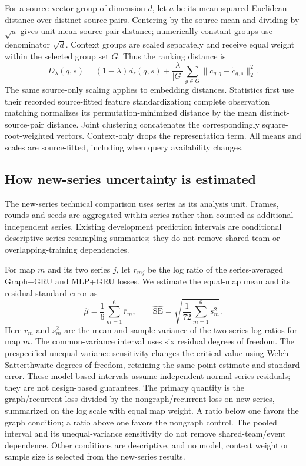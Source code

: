 For a source vector group of dimension $d$, let $a$ be its mean squared Euclidean distance over distinct source pairs. Centering by the source mean and dividing by $\sqrt{a}$ gives unit mean source-pair distance; numerically constant groups use denominator $\sqrt{d}$. Context groups are scaled separately and receive equal weight within the selected group set $G$. Thus the ranking distance is %
\begin{equation}
 D_\lambda(q,s)=(1-\lambda)d_z(q,s)
 +\frac{\lambda}{|G|}\sum_{g\in G}
 \|\widetilde{c}_{g,q}-\widetilde{c}_{g,s}\|_2^2.
\end{equation}
The same source-only scaling applies to embedding distances. Statistics first use their recorded source-fitted feature standardization; complete observation matching normalizes its permutation-minimized distance by the mean distinct-source-pair distance. Joint clustering concatenates the correspondingly square-root-weighted vectors. Context-only drops the representation term. All means and scales are source-fitted, including when query availability changes. %

\subsection{How new-series uncertainty is estimated}
The new-series technical comparison uses series as its analysis unit. Frames, rounds and seeds are aggregated within series rather than counted as additional independent series. Existing development prediction intervals are conditional descriptive series-resampling summaries; they do not remove shared-team or overlapping-training dependencies.

For map $m$ and its two series $j$, let $r_{mj}$ be the log ratio of the series-averaged Graph+GRU and MLP+GRU losses. We estimate the equal-map mean and its residual standard error as %
\begin{equation}
 \widehat{\mu}=\frac{1}{6}\sum_{m=1}^{6}\overline{r}_m,
 \qquad
 \widehat{\mathrm{SE}}=\sqrt{\frac{1}{72}\sum_{m=1}^{6}s_m^2}.
\end{equation}
Here $\overline{r}_m$ and $s_m^2$ are the mean and sample variance of the two series log ratios for map $m$. The common-variance interval uses six residual degrees of freedom. The prespecified unequal-variance sensitivity changes the critical value using Welch--Satterthwaite degrees of freedom, retaining the same point estimate and standard error. These model-based intervals assume independent normal series residuals; they are not design-based guarantees.
The primary quantity is the graph/recurrent loss divided by the nongraph/recurrent loss on new series, summarized on the log scale with equal map weight. A ratio below one favors the graph condition; a ratio above one favors the nongraph control. The pooled interval and its unequal-variance sensitivity do not remove shared-team/event dependence. Other conditions are descriptive, and no model, context weight or sample size is selected from the new-series results. %


